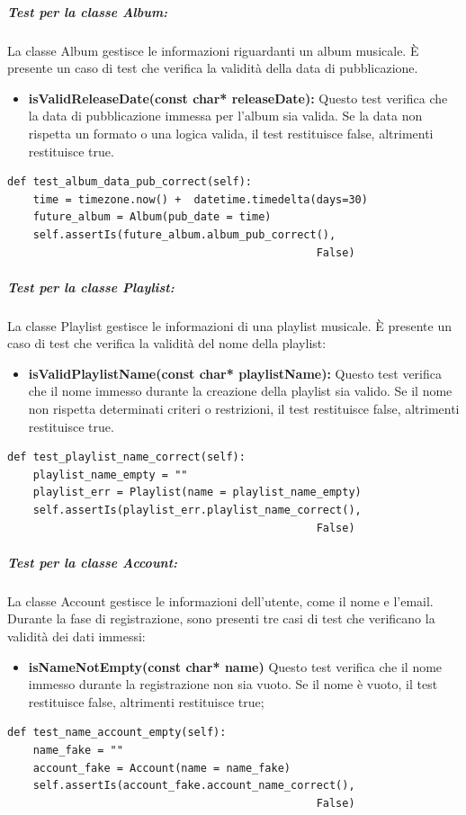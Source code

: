 \subparagraph{Test per la classe \textbf{Album:}} La classe Album gestisce le informazioni riguardanti un album musicale. È presente un caso di test che verifica la validità della data di pubblicazione.
\begin{itemize}
    \item \textbf{isValidReleaseDate(const char* releaseDate):}
    Questo test verifica che la data di pubblicazione immessa per l'album sia valida. Se la data non rispetta un formato o una logica valida, il test restituisce false, altrimenti restituisce true.
\end{itemize}

\begin{lstlisting}[caption={class AlbumModelTests(TestCase)}, captionpos=b]
def test_album_data_pub_correct(self):
    time = timezone.now() +  datetime.timedelta(days=30)
    future_album = Album(pub_date = time)
    self.assertIs(future_album.album_pub_correct(), 
                                                False)
\end{lstlisting} 


\subparagraph{Test per la classe \textbf{Playlist:}} La classe Playlist gestisce le informazioni di una playlist musicale. È presente un caso di test che verifica la validità del nome della playlist:
\begin{itemize}
    \item \textbf{isValidPlaylistName(const char* playlistName):}
    Questo test verifica che il nome immesso durante la creazione della playlist sia valido. Se il nome non rispetta determinati criteri o restrizioni, il test restituisce false, altrimenti restituisce true.
\end{itemize}
\begin{lstlisting}[caption={PlaylistModelTests(TestCase)}, captionpos=b]
def test_playlist_name_correct(self):
    playlist_name_empty = ""
    playlist_err = Playlist(name = playlist_name_empty)
    self.assertIs(playlist_err.playlist_name_correct(), 
                                                False)
\end{lstlisting} 


\subparagraph{Test per la classe \textbf{Account:}} La classe Account gestisce le informazioni dell'utente, come il nome e l'email. 
Durante la fase di registrazione, sono presenti tre casi di test che verificano la validità dei dati immessi:
\vspace{0.2cm}
\begin{itemize}
    \item \textbf{isNameNotEmpty(const char* name)}
    Questo test verifica che il nome immesso durante la registrazione non sia vuoto. Se il nome è vuoto, il test restituisce false, altrimenti restituisce true;
\end{itemize}
\begin{lstlisting}[caption={class AccountModelTests(TestCase)}, captionpos=b]   
def test_name_account_empty(self):
    name_fake = ""
    account_fake = Account(name = name_fake)
    self.assertIs(account_fake.account_name_correct(), 
                                                False)
\end{lstlisting} 
\vspace{0.2cm}

